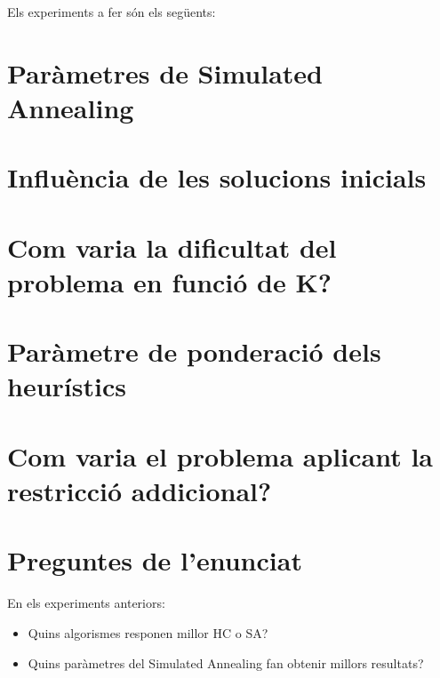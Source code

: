 
Els experiments a fer són els següents:

\section{Paràmetres de Simulated Annealing} %
\label{sec:expSA}


\section{Influència de les solucions inicials} %
\label{sec:expsolini}

	

\section{Com varia la dificultat del problema en funció de K?} %
\label{sec:expk}



\newpage %
\section{Paràmetre de ponderació dels heurístics} %
\label{sec:expkh}




\section{Com varia el problema aplicant la restricció addicional?} %
\label{sec:restadd}





\section{Preguntes de l'enunciat} %
\label{sec:preguntes}

En els experiments anteriors:
\begin{itemize}
\item Quins algorismes responen millor HC o SA?
\item Quins paràmetres del Simulated Annealing fan obtenir millors resultats?
\end{itemize}

